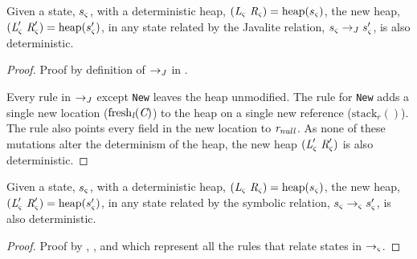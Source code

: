 \begin{lemma}
\label{lem:J-determ}
Given a state, $s_{\varsigma}$, with a deterministic heap,
$(\emph{L}_{\varsigma}\ \emph{R}_{\varsigma}) =
\mathrm{heap}(s_{\varsigma})$, the new heap,
$(\emph{L}_{\varsigma}^\prime\ \emph{R}_{\varsigma}^\prime) =
\mathrm{heap}(s_{\varsigma}^\prime)$, in any state related by the
Javalite relation, $s_{\varsigma} \rightarrow_J s_{\varsigma}^\prime$, is
also deterministic.
\end{lemma}
\begin{proof}
Proof by definition of $\rightarrow_J$ in .

Every rule in $\rightarrow_J$ except \texttt{New} leaves the heap
unmodified. The rule for \texttt{New} adds a single new location
($\mathrm{fresh}_{\emph{l}}(\emph{C})$) to the heap on a single new
reference ($\mathrm{stack}_r()$). The rule also points every field in
the new location to $\emph{r}_\mathit{null}$. As none of these
mutations alter the determinism of the heap, the new heap
$(\cfgnt{L}_\sym^\prime\ \cfgnt{R}_\sym^\prime)$ is also
deterministic.
\end{proof}

\begin{theorem}
\label{thm:determ}
Given a state, $s_{\varsigma}$, with a deterministic heap,
$(\emph{L}_{\varsigma}\ \emph{R}_{\varsigma}) =
\mathrm{heap}(s_{\varsigma})$, the new heap,
$(\emph{L}_{\varsigma}^\prime\ \emph{R}_{\varsigma}^\prime) =
\mathrm{heap}(s_{\varsigma}^\prime)$, in any state related by the
symbolic relation, $s_{\varsigma} \rightarrow_{\varsigma} s_{\varsigma}^\prime$, is
also deterministic.
\end{theorem}
\begin{proof}
Proof by , , and 
which represent all the rules that relate states in
$\rightarrow_{\varsigma}$.
\end{proof}


